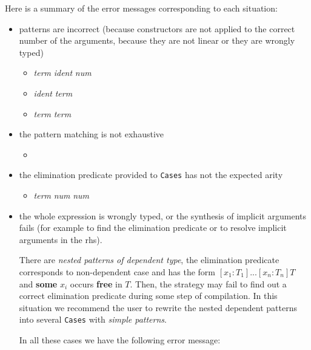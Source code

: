 Here is a summary of the error messages corresponding to each situation:
\begin{itemize}
\item  patterns are incorrect (because constructors are not
applied to the correct number of the arguments, because they  are not linear or they are
wrongly typed)
\begin{itemize}
\item {} {\sl term}  {\sl ident}
 {\sl num} 

\item {} {\sl ident}  {\sl term}

\item {} {\sl term}   {\sl term}
\end{itemize}

\item the pattern matching is not exhaustive
\begin{itemize}
\item {} 
\end{itemize}
\item the elimination predicate provided to \verb+Cases+  has not the expected arity

\begin{itemize}
\item {} {\sl term}  {\sl num}   {\sl num} 
\end{itemize}

 \item  the whole expression is wrongly typed, or the synthesis of implicit arguments fails (for example to find
the elimination predicate or to resolve implicit arguments in the rhs).


There are {\em nested patterns  of dependent type}, the
elimination predicate corresponds to non-dependent case and has the  form $[x_1:T_1]...[x_n:T_n]T$
and {\bf some} $x_i$ occurs {\bf free} in
$T$.  Then, the  strategy may fail to find out a correct elimination
predicate during some step of compilation.
In this situation we recommend the user to rewrite the nested
dependent patterns into several \verb+Cases+ with  {\em simple patterns}.

In all these cases we have the following error message:


\end{itemize}
